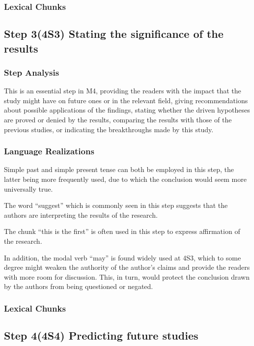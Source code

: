 \documentclass{ctexbook}
\begin{document}
    \subsubsection{Lexical Chunks}

  \subsection{Step 3(4S3) Stating the significance of the results}
    \subsubsection{Step Analysis}

    This is an essential step in M4, providing the readers with the impact that the study might have on future ones or in the relevant field, giving recommendations about possible applications of the findings, stating whether the driven hypotheses are proved or denied by the results, comparing the results with those of the previous studies, or indicating the breakthroughs made by this study.

    \subsubsection{Language Realizations}

    Simple past and simple present tense can both be employed in this step, the latter being more frequently used, due to which the conclusion would seem more universally true.
    
    The word ``suggest'' which is commonly seen in this step suggests that the authors are interpreting the results of the research.
    
    The chunk ``this is the first'' is often used in this step to express affirmation of the research.
    
    In addition, the modal verb ``may'' is found widely used at 4S3, which to some degree might weaken the authority of the author's claims and provide the readers with more room for discussion. This, in turn, would protect the conclusion drawn by the authors from being questioned or negated.


    \subsubsection{Lexical Chunks}

  \subsection{Step 4(4S4) Predicting future studies}
\end{document}
